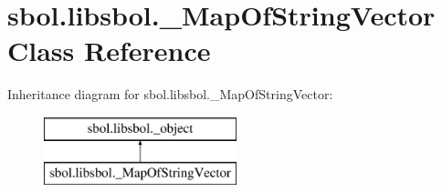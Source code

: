 \hypertarget{classsbol_1_1libsbol_1_1___map_of_string_vector}{}\section{sbol.\+libsbol.\+\_\+\+Map\+Of\+String\+Vector Class Reference}
\label{classsbol_1_1libsbol_1_1___map_of_string_vector}
Inheritance diagram for sbol.\+libsbol.\+\_\+\+Map\+Of\+String\+Vector\+:\begin{figure}[H]
\begin{center}
\leavevmode
\includegraphics[height=2.000000cm]{classsbol_1_1libsbol_1_1___map_of_string_vector}
\end{center}
\end{figure}
